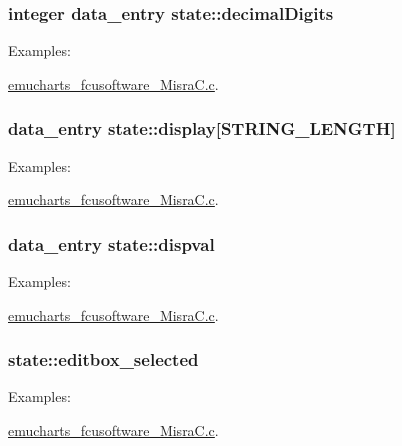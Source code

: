 \subsubsection[{\texorpdfstring{decimal\+Digits}{decimalDigits}}]{\setlength{\rightskip}{0pt plus 5cm}integer data\+\_\+entry state\+::decimal\+Digits}\hypertarget{structstate_ae7318648ca1bb2d6477337b86090022a}{}\label{structstate_ae7318648ca1bb2d6477337b86090022a}
\begin{Desc}
\item[Examples\+: ]\par
\hyperlink{emucharts_fcusoftware__misra_c_8c-example}{emucharts\+\_\+fcusoftware\+\_\+\+Misra\+C.\+c}.\end{Desc}
\subsubsection[{\texorpdfstring{display}{display}}]{ data\+\_\+entry state\+::display\mbox{[}{\bf S\+T\+R\+I\+N\+G\+\_\+\+L\+E\+N\+G\+TH}\mbox{]}}\hypertarget{structstate_a6a18e3e28b7b18141f7c1afc1e8d36e1}{}\label{structstate_a6a18e3e28b7b18141f7c1afc1e8d36e1}
\begin{Desc}
\item[Examples\+: ]\par
\hyperlink{emucharts_fcusoftware__misra_c_8c-example}{emucharts\+\_\+fcusoftware\+\_\+\+Misra\+C.\+c}.\end{Desc}
\subsubsection[{\texorpdfstring{dispval}{dispval}}]{ data\+\_\+entry state\+::dispval}\hypertarget{structstate_ae8964be364b75ddef3b2c84246098b89}{}\label{structstate_ae8964be364b75ddef3b2c84246098b89}
\begin{Desc}
\item[Examples\+: ]\par
\hyperlink{emucharts_fcusoftware__misra_c_8c-example}{emucharts\+\_\+fcusoftware\+\_\+\+Misra\+C.\+c}.\end{Desc}
\subsubsection[{\texorpdfstring{editbox\+\_\+selected}{editbox_selected}}]{ state\+::editbox\+\_\+selected}\hypertarget{structstate_a01594636777fc241d60eeb6129b9ac4a}{}\label{structstate_a01594636777fc241d60eeb6129b9ac4a}
\begin{Desc}
\item[Examples\+: ]\par
\hyperlink{emucharts_fcusoftware__misra_c_8c-example}{emucharts\+\_\+fcusoftware\+\_\+\+Misra\+C.\+c}.\end{Desc}

